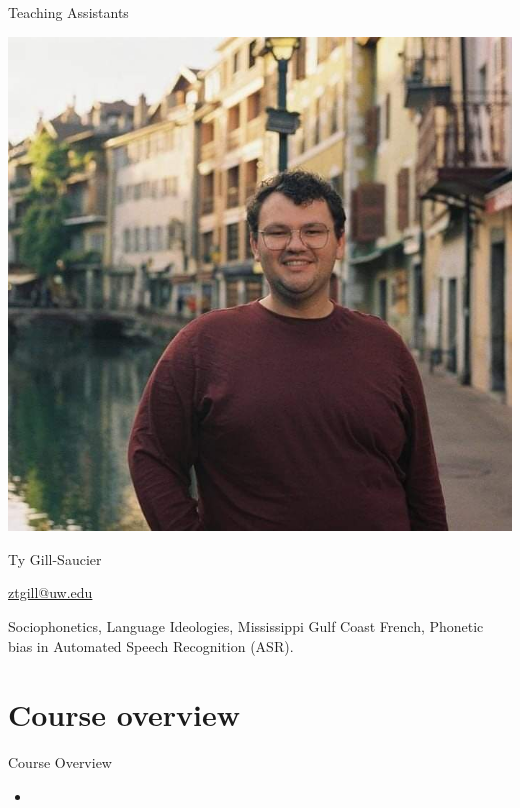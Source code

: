\documentclass{beamer}
\begin{document}
\begin{frame}{Teaching Assistants}
    \begin{multicols}{2}
        \begin{center}
            \includegraphics[width=0.9\linewidth]{figs/Gill_2022.jpg} %
        \end{center}
        \columnbreak
        \begin{description}[font=\bfseries]
            \item[Name:] Ty Gill-Saucier
            \item[Contact:] \href{mailto:ztgill@uw.edu}{ztgill@uw.edu}
            \item[Research Interests:] Sociophonetics, Language
            Ideologies, Mississippi Gulf Coast French, Phonetic bias in
            Automated Speech Recognition (ASR).
        \end{description}
    \end{multicols}
\end{frame}

\section{Course overview}
\begin{frame}{Course Overview}
    \begin{itemize}
        \item 
    \end{itemize}
\end{frame}
\end{document}
